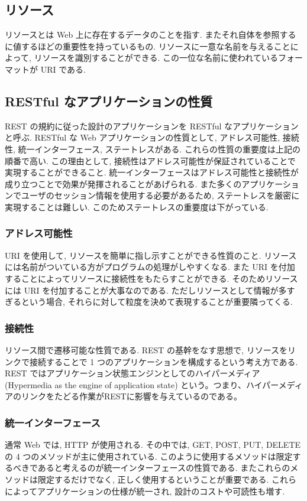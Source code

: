 \documentclass[a4j, 10pt, twocolumn]{ujarticle}
\begin{document}
    \subsection{リソース}  
    リソースとは Web 上に存在するデータのことを指す. またそれ自体を参照するに値するほどの重要性を持っているもの. リソースに一意な名前を与えることによって, リソースを識別することができる. この一位な名前に使われているフォーマットが URI である.

    \subsection{RESTful なアプリケーションの性質}
    REST の規約に従った設計のアプリケーションを RESTful なアプリケーションと呼ぶ. RESTful な Web アプリケーションの性質として, アドレス可能性, 接続性, 統一インターフェース, ステートレスがある. これらの性質の重要度は上記の順番で高い. この理由として, 接続性はアドレス可能性が保証されていることで実現することができること. 統一インターフェースはアドレス可能性と接続性が成り立つことで効果が発揮されることがあげられる. また多くのアプリケーションでユーザのセッション情報を使用する必要があるため, ステートレスを厳密に実現することは難しい. このためステートレスの重要度は下がっている. 


    \subsubsection{アドレス可能性}
    URI を使用して, リソースを簡単に指し示すことができる性質のこと. リソースには名前がついている方がプログラムの処理がしやすくなる. また URI を付加することによってリソースに接続性をもたらすことができる. そのためリソースには URI を付加することが大事なのである. ただしリソースとして情報が多すぎるという場合, それらに対して粒度を決めて表現することが重要隣ってくる.  

    \subsubsection{接続性}
    リソース間で遷移可能な性質である. REST の基幹をなす思想で, リソースをリンクで接続することで 1 つのアプリケーションを構成するという考え方である. REST ではアプリケーション状態エンジンとしてのハイパーメディア (Hypermedia as the engine of application state) という。つまり、ハイパーメディアのリンクをたどる作業がRESTに影響を与えているのである。

    \subsubsection{統一インターフェース}
    通常 Web では, HTTP が使用される. その中では, GET, POST, PUT, DELETE の 4 つのメソッドが主に使用されている. このように使用するメソッドは限定するべきであると考えるのが統一インターフェースの性質である. またこれらのメソッドは限定するだけでなく, 正しく使用するということが重要である. これらによってアプリケーションの仕様が統一され, 設計のコストや可読性も増す.
\end{document}
